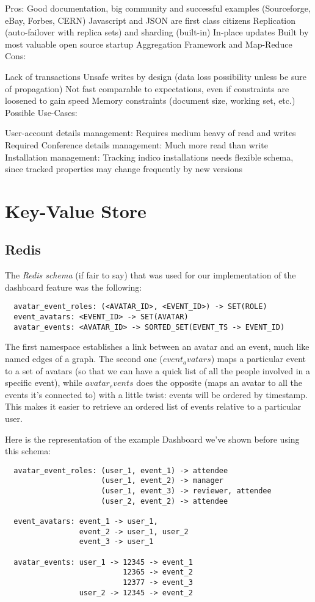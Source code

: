 Pros:
Good documentation, big community and successful examples (Sourceforge, eBay, Forbes, CERN)
Javascript and JSON are first class citizens
Replication (auto-failover with replica sets) and sharding (built-in)
In-place updates
Built by most valuable open source startup
Aggregation Framework and Map-Reduce
Cons:

Lack of transactions
Unsafe writes by design (data loss possibility unless be sure of propagation)
Not fast comparable to expectations, even if constraints are loosened to gain speed
Memory constraints (document size, working set, etc.)
Possible Use-Cases:

User-account details management:
Requires medium heavy of read and writes
Required
Conference details management:
Much more read than write
Installation management:
Tracking indico installations needs flexible schema, since tracked properties may change frequently by new versions

\section{Key-Value Store}

\subsection{Redis}

The \textit{Redis schema} (if fair to say) that was used for our implementation of the dashboard feature was the following:

\begin{lstlisting}
  avatar_event_roles: (<AVATAR_ID>, <EVENT_ID>) -> SET(ROLE)
  event_avatars: <EVENT_ID> -> SET(AVATAR)
  avatar_events: <AVATAR_ID> -> SORTED_SET(EVENT_TS -> EVENT_ID)
\end{lstlisting}

The first namespace establishes a link between an avatar and an event, much like named edges of a graph. The second one ($event_avatars$) maps a particular event to a set of avatars (so that we can have a quick list of all the people involved in a specific event), while $avatar_events$ does the opposite (maps an avatar to all the events it's connected to) with a little twist: events will be ordered by timestamp. This makes it easier to retrieve an ordered list of events relative to a particular user.

Here is the representation of the example Dashboard we've shown before using this schema:
\begin{lstlisting}
  avatar_event_roles: (user_1, event_1) -> attendee
                      (user_1, event_2) -> manager
                      (user_1, event_3) -> reviewer, attendee
                      (user_2, event_2) -> attendee

  event_avatars: event_1 -> user_1,
                 event_2 -> user_1, user_2
                 event_3 -> user_1

  avatar_events: user_1 -> 12345 -> event_1
                           12365 -> event_2
                           12377 -> event_3
                 user_2 -> 12345 -> event_2
\end{lstlisting}


